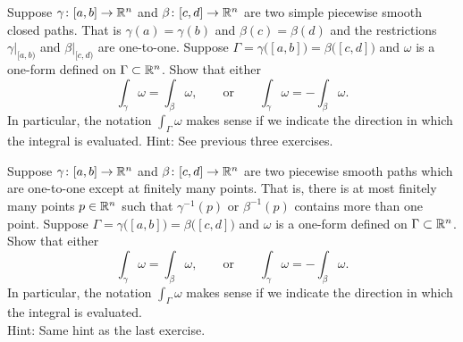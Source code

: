 \pagebreak[1]
\begin{exercise} \label{mv:exercise:closedcurveintegral}
Suppose $\gamma \colon [a,b] \to {\mathbb{R}}^n$ and
$\beta \colon [c,d] \to {\mathbb{R}}^n$ are two simple piecewise smooth closed paths.
That is $\gamma(a)=\gamma(b)$ and $\beta(c) = \beta(d)$ and
the restrictions $\gamma|_{[a,b)}$ and $\beta|_{[c,d)}$ are one-to-one.
Suppose $\Gamma = \gamma\bigl([a,b]\bigr) = \beta\bigl([c,d]\bigr)$ and
$\omega$ is a one-form defined on $\Gamma \subset {\mathbb{R}}^n$.  Show that either
\begin{equation*}
\int_\gamma \omega = 
\int_\beta \omega,
\qquad \text{or} \qquad 
\int_\gamma \omega = 
- \int_\beta \omega.
\end{equation*}
In particular, the notation $\int_{\Gamma} \omega$ makes sense if we indicate
the direction in which the integral is evaluated.
Hint: See previous three exercises.
\end{exercise}

\begin{exercise} \label{mv:exercise:curveintegral}
Suppose $\gamma \colon [a,b] \to {\mathbb{R}}^n$ and
$\beta \colon [c,d] \to {\mathbb{R}}^n$ are two piecewise smooth paths
which are one-to-one except at finitely many points.  That is, there is at
most finitely many points $p \in {\mathbb{R}}^n$ such that
$\gamma^{-1}(p)$ or $\beta^{-1}(p)$ contains more than one point.
Suppose $\Gamma = \gamma\bigl([a,b]\bigr) = \beta\bigl([c,d]\bigr)$ and $\omega$ is a
one-form defined on $\Gamma \subset {\mathbb{R}}^n$.  Show that either
\begin{equation*}
\int_\gamma \omega = 
\int_\beta \omega,
\qquad \text{or} \qquad 
\int_\gamma \omega = 
- \int_\beta \omega.
\end{equation*}
In particular, the notation $\int_{\Gamma} \omega$ makes sense if we indicate
the direction in which the integral is evaluated.
\\
Hint: Same hint as the last exercise.
\end{exercise}

